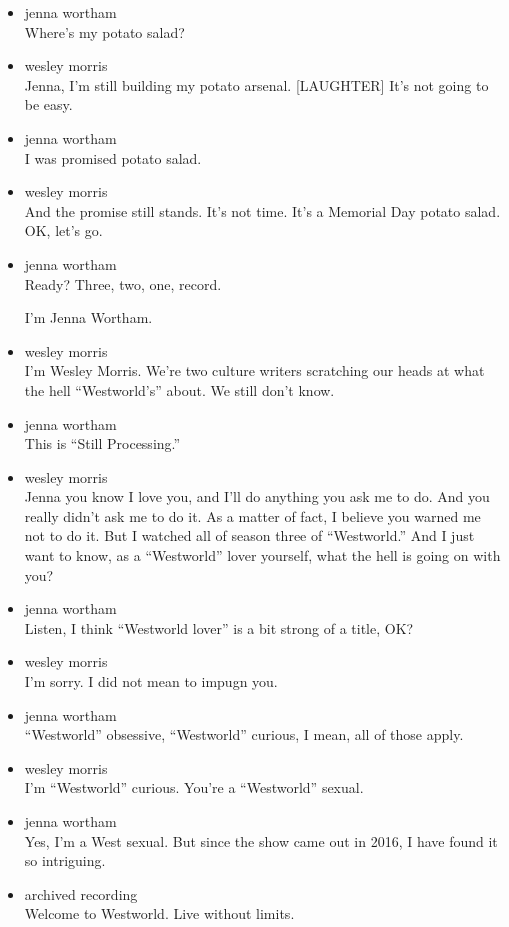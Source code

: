 \begin{itemize}
\item
  jenna wortham\\
  Where's my potato salad?
\item
  wesley morris\\
  Jenna, I'm still building my potato arsenal. {[}LAUGHTER{]} It's not
  going to be easy.
\item
  jenna wortham\\
  I was promised potato salad.
\item
  wesley morris\\
  And the promise still stands. It's not time. It's a Memorial Day
  potato salad. OK, let's go.
\item
  jenna wortham\\
  Ready? Three, two, one, record.

  I'm Jenna Wortham.
\item
  wesley morris\\
  I'm Wesley Morris. We're two culture writers scratching our heads at
  what the hell ``Westworld's'' about. We still don't know.
\item
  jenna wortham\\
  This is ``Still Processing.''
\item
  wesley morris\\
  Jenna you know I love you, and I'll do anything you ask me to do. And
  you really didn't ask me to do it. As a matter of fact, I believe you
  warned me not to do it. But I watched all of season three of
  ``Westworld.'' And I just want to know, as a ``Westworld'' lover
  yourself, what the hell is going on with you?
\item
  jenna wortham\\
  Listen, I think ``Westworld lover'' is a bit strong of a title, OK?
\item
  wesley morris\\
  I'm sorry. I did not mean to impugn you.
\item
  jenna wortham\\
  ``Westworld'' obsessive, ``Westworld'' curious, I mean, all of those
  apply.
\item
  wesley morris\\
  I'm ``Westworld'' curious. You're a ``Westworld'' sexual.
\item
  jenna wortham\\
  Yes, I'm a West sexual. But since the show came out in 2016, I have
  found it so intriguing.
\item
  archived recording\\
  Welcome to Westworld. Live without limits.
\end{itemize}

